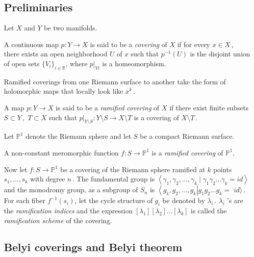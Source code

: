 \subsection{Preliminaries}
Let $X$ and $Y$ be two manifolds.
\begin{dfn}
    A continuous map $p : Y \rightarrow X$ is said to be a \textit{covering} of $X$ if for every $x \in X\,,$ there exists an open neighborhood $U$ of $x$ such that
    $p^{-1}(U)$ is the disjoint union of open sets $\{V_i\}_{i\in\mathbb{R}}$, where $p|_{Vi}$ is a homeomorphism.
\end{dfn}
\begin{rem}
    Ramified coverings from one Riemann surface to another take the form of holomorphic maps that locally look like $x^k\,.$
\end{rem}
\begin{dfn}
    A map $p : Y \rightarrow X$ is said to be a \textit{ramified covering} of $X$ if there exist finite subsets $S\subset Y\,,$ $T \subset X$ such that $p|_{Y\setminus S} :Y \setminus S \rightarrow X\setminus T$ is a covering of $X \setminus T\,.$
\end{dfn}
Let $\mathbb{P}^{1}$ denote the Riemann sphere and let $S$ be a compact Riemann surface.
\begin{prop}
 A non-constant meromorphic function $f: S \rightarrow \mathbb{P}^{1}$ is a \textit{ramified covering} of $\mathbb{P}^{1}$.   
\end{prop}
Now let $f: S \rightarrow \mathbb{P}^{1}$ be a covering of the Riemann sphere ramified at $k$ points $s_{1}, \ldots, s_{k}$ with degree $n\,.$  The fundamental group is $\left\langle\gamma_{1}, \gamma_{2}, \ldots, \gamma_{k} \mid \gamma_{1} \gamma_{2} \ldots \gamma_{k}=i d\right\rangle$ and the monodromy group, as a subgroup of $S_n$ is $\left\langle g_{1}, g_{2}, \ldots, g_{k}\right| g_{1} g_{2} \ldots g_{k}=$ $i d\rangle\,.$ For each fiber $f^{-1}\left(s_{i}\right)$, let the cycle structure of $g_{i}$ be denoted by $\lambda_{i}\,.$ $\lambda_{i}$ 's are the \textit{ramification indices} and the expression $\left[\lambda_{1}\right]\left[\lambda_{2}\right] \ldots\left[\lambda_{k}\right]$ is called the \textit{ramification scheme} of the covering.

\subsection{Belyi coverings and Belyi theorem}

